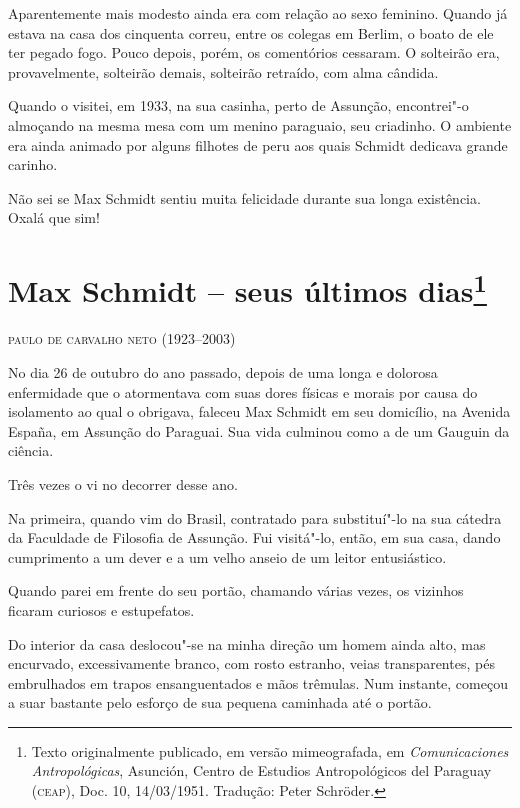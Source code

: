 Aparentemente mais modesto ainda era com relação ao sexo feminino.
Quando já estava na casa dos cinquenta correu, entre os colegas em
Berlim, o boato de ele ter pegado fogo. Pouco depois, porém, os
comentórios cessaram. O solteirão era, provavelmente, solteirão demais,
solteirão retraído, com alma cândida.

Quando o visitei, em 1933, na sua casinha, perto de Assunção,
encontrei"-o almoçando na mesma mesa com um menino paraguaio, seu
criadinho. O ambiente era ainda animado por alguns filhotes de peru aos
quais Schmidt dedicava grande carinho.

Não sei se Max Schmidt sentiu muita felicidade durante sua longa
existência. Oxalá que sim!

\chapter[Max Schmidt -- seus últimos dias, \emph{por Paulo de Carvalho Neto}]{Max Schmidt -- seus últimos dias\footnote[*]{Texto originalmente
  publicado, em versão mimeografada, em \emph{Comunicaciones
  Antropológicas}, Asunción, Centro de Estudios Antropológicos del
  Paraguay (\textsc{ceap}), Doc. 10, 14/03/1951. Tradução: Peter Schröder.}}

\begin{flushright}
\textsc{paulo de carvalho neto (1923--2003)}\medskip
\end{flushright}

No dia 26 de outubro do ano passado, depois de uma longa e dolorosa
enfermidade que o atormentava com suas dores físicas e morais por causa
do isolamento ao qual o obrigava, faleceu Max Schmidt em seu domicílio,
na Avenida España, em Assunção do Paraguai. Sua vida culminou como a de
um Gauguin da ciência.

Três vezes o vi no decorrer desse ano.

Na primeira, quando vim do Brasil, contratado para substituí"-lo na sua
cátedra da Faculdade de Filosofia de Assunção. Fui visitá"-lo, então, em
sua casa, dando cumprimento a um dever e a um velho anseio de um leitor
entusiástico.

Quando parei em frente do seu portão, chamando várias vezes, os vizinhos
ficaram curiosos e estupefatos.

Do interior da casa deslocou"-se na minha direção um homem ainda alto,
mas encurvado, excessivamente branco, com rosto estranho, veias
transparentes, pés embrulhados em trapos ensanguentados e mãos trêmulas.
Num instante, começou a suar bastante pelo esforço de sua pequena
caminhada até o portão.

